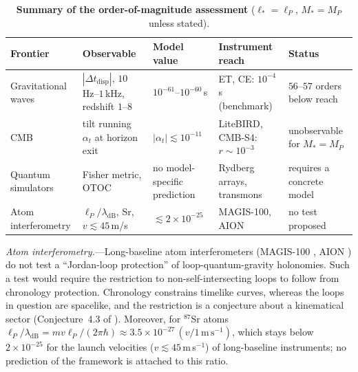 \documentclass[aps,prl,reprint,twocolumn,superscriptaddress,nofootinbib,floatfix]{revtex4-2}
\begin{document}
\begin{table}[t]
\centering
\caption{\textbf{Summary of the order-of-magnitude assessment} ($\ell_\ast = \ell_P$, $M_\ast = M_P$ unless stated).}
\label{tab:experiments}
\begin{ruledtabular}
\begin{tabular}{lllll}
\textbf{Frontier} & \parbox[t]{2.0cm}{\raggedright\small\textbf{Observable}} & \textbf{Model value} & \parbox[t]{2.0cm}{\raggedright\small\textbf{Instrument reach}} & \parbox[t]{2.5cm}{\raggedright\textbf{Status}} \\
\midrule
Gravitational waves & \parbox[t]{1.9cm}{\raggedright $|\Delta t_{\mathrm{disp}}|$, $10$\,Hz--$1$\,kHz, redshift $1$--$8$} & $10^{-61}$--$10^{-60}$\,s & \parbox[t]{1.9cm}{\raggedright ET, CE: $10^{-4}$\,s (benchmark)} & \parbox[t]{2.5cm}{\raggedright $56$--$57$ orders below reach} \\
\addlinespace[3pt]
CMB & \parbox[t]{1.9cm}{\raggedright tilt running $\alpha_t$ at horizon exit} & $|\alpha_t| \lesssim 10^{-11}$ & \parbox[t]{1.9cm}{\raggedright LiteBIRD, CMB-S4: $r \sim 10^{-3}$} & \parbox[t]{2.5cm}{\raggedright unobservable for $M_\ast = M_P$} \\
\addlinespace[3pt]
Quantum simulators & \parbox[t]{1.9cm}{\raggedright Fisher metric, OTOC} & \parbox[t]{2.1cm}{\raggedright no model-specific prediction} & \parbox[t]{1.9cm}{\raggedright Rydberg arrays, transmons} & \parbox[t]{2.5cm}{\raggedright requires a concrete model} \\
\addlinespace[3pt]
Atom interferometry & \parbox[t]{1.9cm}{\raggedright $\ell_P/\lambda_{\mathrm{dB}}$, Sr, $v \lesssim 45$\,m/s} & $\lesssim 2 \times 10^{-25}$ & \parbox[t]{1.9cm}{\raggedright MAGIS-100, AION} & \parbox[t]{2.5cm}{\raggedright no test proposed} \\
\end{tabular}
\end{ruledtabular}
\end{table}

\emph{Atom interferometry.}---Long-baseline atom interferometers (MAGIS-100 \cite{abe2021matter}, AION \cite{badurina2020aion}) do not test a ``Jordan-loop protection'' of loop-quantum-gravity holonomies. Such a test would require the restriction to non-self-intersecting loops to follow from chronology protection. Chronology constrains timelike curves, whereas the loops in question are spacelike, and the restriction is a conjecture about a kinematical sector (Conjecture~4.3 of \cite{silvafilho2026grand}). Moreover, for $^{87}$Sr atoms $\ell_P/\lambda_{\mathrm{dB}} = m v \ell_P/(2\pi\hbar) \approx 3.5 \times 10^{-27}\,(v/1\,\mathrm{m\,s^{-1}})$, which stays below $2 \times 10^{-25}$ for the launch velocities ($v \lesssim 45$\,m\,s$^{-1}$) of long-baseline instruments; no prediction of the framework is attached to this ratio.
\end{document}
